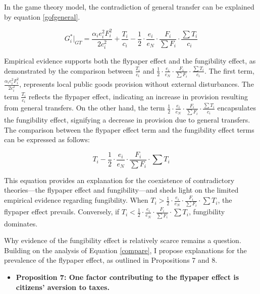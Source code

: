 \documentclass[man]{apa7}
\begin{document}
In the game theory model, the contradiction of general transfer can be explained by equation \ref{gofgeneral}.

$$G_i^*|_{GT}=\frac{\alpha_i e_i^2F_i^2}{2c_i^2}+\frac{T_i}{c_i}-\frac{1}{2}\cdot \frac{e_i}{e_N}\cdot \frac{F_i}{\sum F_i} \cdot \frac{\sum T_i}{c_i}$$

Empirical evidence supports both the flypaper effect and the fungibility effect, as demonstrated by the comparison between $\frac{T_i}{c_i}$ and $\frac{1}{2}\cdot \frac{e_i}{e_N}\cdot \frac{F_i}{\sum F_i} \cdot \frac{\sum T_i}{c_i}$. The first term, $\frac{\alpha_i e_i^2F_i^2}{2c_i^2}$, represents local public goods provision without external disturbances. The term $\frac{T_i}{c_i}$ reflects the flypaper effect, indicating an increase in provision resulting from general transfers. On the other hand, the term $\frac{1}{2}\cdot \frac{e_i}{e_N}\cdot \frac{F_i}{\sum F_i} \cdot \frac{\sum T_i}{c_i}$ encapsulates the fungibility effect, signifying a decrease in provision due to general transfers. The comparison between the flypaper effect term and the fungibility effect terms can be expressed as follows:%

\begin{equation}
  T_i-\frac{1}{2}\cdot \frac{e_i}{e_N}\cdot \frac{F_i}{\sum F_i} \cdot \sum T_i \label{compare}
\end{equation}


This equation provides an explanation for the coexistence of contradictory theories—the flypaper effect and fungibility—and sheds light on the limited empirical evidence regarding fungibility. When $T_i>\frac{1}{2}\cdot \frac{e_i}{e_N}\cdot \frac{F_i}{\sum F_i} \cdot \sum T_i$, the flypaper effect prevails. Conversely, if $T_i<\frac{1}{2}\cdot \frac{e_i}{e_N}\cdot \frac{F_i}{\sum F_i} \cdot \sum T_i$, fungibility dominates.

Why evidence of the fungibility effect is relatively scarce remains a question. Building on the analysis of Equation \ref{compare}, I propose explanations for the prevalence of the flypaper effect, as outlined in Propositions 7 and 8.

\begin {itemize}
\item \textbf{Proposition 7: One factor contributing to the flypaper effect is citizens' aversion to taxes.}
\end{itemize}
\end{document}
